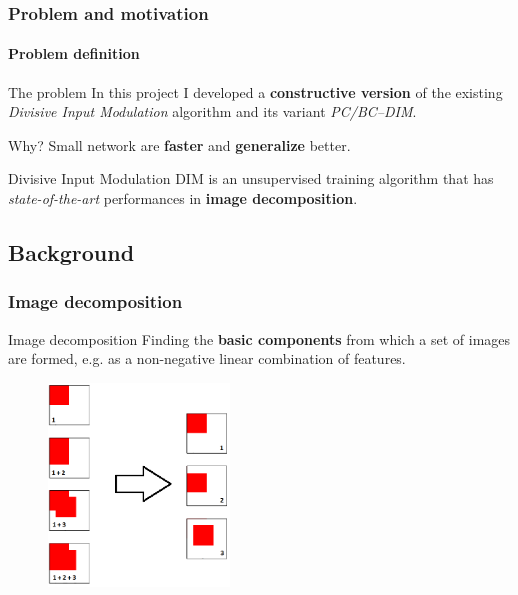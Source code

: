 \documentclass{beamer}
\begin{document}
			\begin{frame}
				\frametitle{Problem and motivation}
				\framesubtitle{Problem definition}
				\begin{exampleblock}{The problem}
					In this project I developed a \textbf{constructive version} of the existing \emph{Divisive Input Modulation} algorithm and its variant \emph{PC/BC--DIM}.
				\end{exampleblock}
				\begin{block}{Why?}
					Small network are \textbf{faster} and \textbf{generalize} better.
				\end{block}
				\begin{block}{Divisive Input Modulation}
					DIM is an unsupervised training algorithm that has \emph{state-of-the-art} performances in \textbf{image decomposition}.
				\end{block}
			\end{frame}
		
		
		\subsection{Background}
			\begin{frame}
				\frametitle{Image decomposition}
				\begin{block}{Image decomposition}
					Finding the \textbf{basic components} from which a set of images are formed, e.g. as a non-negative linear combination of features.
				\end{block}
				\begin{figure}[h]
					\centering
					\includegraphics[width=0.43\textwidth]{decomposition}
				\end{figure}
			\end{frame}
			
\end{document}
